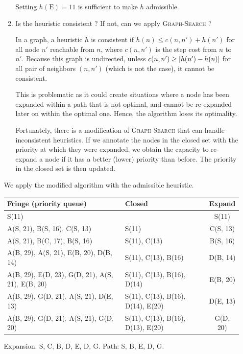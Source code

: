 \documentclass[11pt, a4paper]{article}
\begin{document}
\begin{enumerate}
\begin{enumerate}
\begin{solution}
            Setting $h(\text{E}) = 11$ is sufficient to make $h$ admissible.
        \end{solution}

        \item Is the heuristic consistent ? If not, can we apply \textsc{Graph-Search} ?

        \begin{solution}
            In a graph, a heuristic $h$ is consistent if $h(n) \leq c(n, n') + h(n')$ for all node $n'$ reachable from $n$, where $c(n, n')$ is the step cost from $n$ to $n'$. Because this graph is undirected, unless $c(n, n') \geq \lvert h(n') - h(n)\rvert$ for all pair of neighbors $(n, n')$ (which is not the case), it cannot be consistent.

            This is problematic as it could create situations where a node has been expanded within a path that is not optimal, and cannot be re-expanded later on within the optimal one. Hence, the algorithm loses its optimality.

            Fortunately, there is a modification of \textsc{Graph-Search} that can handle inconsistent heuristics. If we annotate the nodes in the closed set with the priority at which they were expanded, we obtain the capacity to re-expand a node if it has a better (lower) priority than before. The priority in the closed set is then updated.
        \end{solution}
    \end{enumerate}

    \begin{solution}
        We apply the modified algorithm with the admissible heuristic.

        \begin{table}[h]
            \centering
            \begin{tabular}{l|l|c}
                \toprule
                Fringe (priority queue) & Closed & Expand \\
                \midrule
                S(11) & & S(11) \\
                A(S, 21), B(S, 16), C(S, 13) & S(11) & C(S, 13) \\
                A(S, 21), B(C, 17), B(S, 16) & S(11), C(13) & B(S, 16) \\
                A(B, 29), A(S, 21), E(B, 20), D(B, 14) & S(11), C(13), B(16) & D(B, 14) \\
                A(B, 29), E(D, 23), G(D, 21), A(S, 21), E(B, 20) & S(11), C(13), B(16), D(14) & E(B, 20) \\
                A(B, 29), G(D, 21), A(S, 21), D(E, 13) & S(11), C(13), B(16), D(14), E(20) & D(E, 13) \\
                A(B, 29), G(D, 21), A(S, 21), G(D, 20) & S(11), C(13), B(16), D(13), E(20) & G(D, 20) \\
                \bottomrule
            \end{tabular}
        \end{table}

        Expansion: S, C, B, D, E, D, G. Path: S, B, E, D, G.
    \end{solution}
\end{enumerate}
\end{document}
